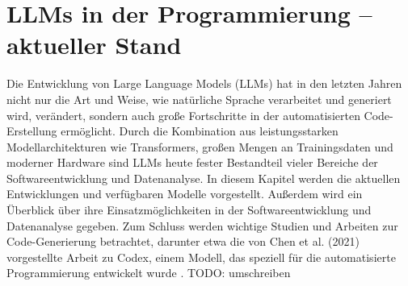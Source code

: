 \documentclass[11pt,a4paper]{article}
\begin{document}
\section{LLMs in der Programmierung – aktueller Stand}
Die Entwicklung von Large Language Models (LLMs) hat in den letzten Jahren nicht nur die Art und Weise, wie natürliche Sprache verarbeitet und generiert wird, verändert, sondern auch große Fortschritte in der automatisierten Code-Erstellung ermöglicht. Durch die Kombination aus leistungsstarken Modellarchitekturen wie Transformers, großen Mengen an Trainingsdaten und moderner Hardware sind LLMs heute fester Bestandteil vieler Bereiche der Softwareentwicklung und Datenanalyse\cite{9413901}.
In diesem Kapitel werden die aktuellen Entwicklungen und verfügbaren Modelle vorgestellt. Außerdem wird ein Überblick über ihre Einsatzmöglichkeiten in der Softwareentwicklung und Datenanalyse gegeben. Zum Schluss werden wichtige Studien und Arbeiten zur Code-Generierung betrachtet, darunter etwa die von Chen et al. (2021) vorgestellte Arbeit zu Codex, einem Modell, das speziell für die automatisierte Programmierung entwickelt wurde \cite{chen2021evaluatinglargelanguagemodels}.
TODO: umschreiben
\end{document}
